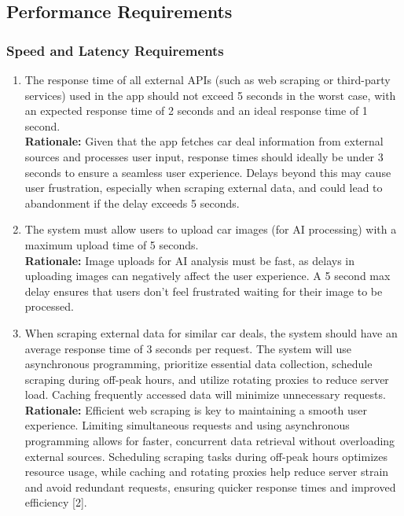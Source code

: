 \documentclass[]{article}
\begin{document}
\subsection{Performance Requirements}
\label{sub:performance_requirements}

\subsubsection{Speed and Latency Requirements}
\label{ssub:speed_and_latency_requirements}
\begin{enumerate}[{PR-SL}1.]
    \item The response time of all external APIs (such as web scraping or third-party services) used in the app should not exceed 5 seconds in the worst case, with an expected response time of 2 seconds and an ideal response time of 1 second.  \\
    \textbf{Rationale:} Given that the app fetches car deal information from external sources and processes user input, response times should ideally be under 3 seconds to ensure a seamless user experience. Delays beyond this may cause user frustration, especially when scraping external data, and could lead to abandonment if the delay exceeds 5 seconds.

    \item The system must allow users to upload car images (for AI processing) with a maximum upload time of 5 seconds.  \\
    \textbf{Rationale:} Image uploads for AI analysis must be fast, as delays in uploading images can negatively affect the user experience. A 5 second max delay ensures that users don't feel frustrated waiting for their image to be processed.

    \item When scraping external data for similar car deals, the system should have an average response time of 3 seconds per request. The system will use asynchronous programming, prioritize essential data collection, schedule scraping during off-peak hours, and utilize rotating proxies to reduce server load. Caching frequently accessed data will minimize unnecessary requests.  \\
    \textbf{Rationale:} Efficient web scraping is key to maintaining a smooth user experience. Limiting simultaneous requests and using asynchronous programming allows for faster, concurrent data retrieval without overloading external sources. Scheduling scraping tasks during off-peak hours optimizes resource usage, while caching and rotating proxies help reduce server strain and avoid redundant requests, ensuring quicker response times and improved efficiency [2].
\end{enumerate}
\end{document}
